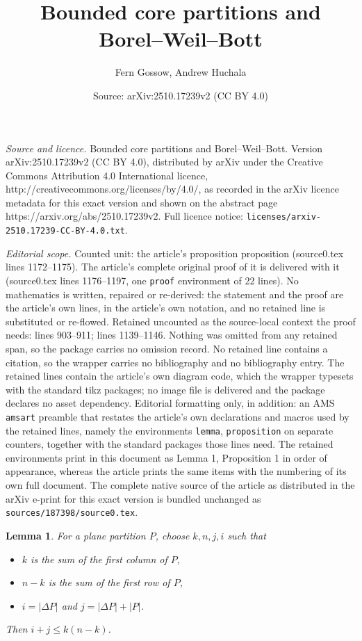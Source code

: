 \documentclass[10pt,a4paper]{amsart}
\title{Bounded core partitions and Borel--Weil--Bott}
\author{Fern Gossow, Andrew Huchala}
\date{Source: arXiv:2510.17239v2 (CC BY 4.0)}
\newtheorem{lemma}{Lemma}
\begin{document}
\maketitle

\noindent\emph{Source and licence.} Bounded core partitions and Borel--Weil--Bott. Version arXiv:2510.17239v2 (CC BY 4.0), distributed by arXiv under the Creative Commons Attribution 4.0 International licence, http://creativecommons.org/licenses/by/4.0/, as recorded in the arXiv licence metadata for this exact version and shown on the abstract page https://arxiv.org/abs/2510.17239v2. Full licence notice: \texttt{licenses/arxiv-2510.17239-CC-BY-4.0.txt}.\par\smallskip

\noindent\textit{Editorial scope.} Counted unit: the article's proposition proposition (source0.tex lines 1172--1175). The article's complete original proof of it is delivered with it (source0.tex lines 1176--1197, one \texttt{proof} environment of 22 lines). No mathematics is written, repaired or re-derived: the statement and the proof are the article's own lines, in the article's own notation, and no retained line is substituted or re-flowed.  Retained uncounted as the source-local context the proof needs: lines 903--911; lines 1139--1146.  Nothing was omitted from any retained span, so the package carries no omission record.  No retained line contains a citation, so the wrapper carries no bibliography and no bibliography entry.  The retained lines contain the article's own diagram code, which the wrapper typesets with the standard tikz packages; no image file is delivered and the package declares no asset dependency.  Editorial formatting only, in addition: an AMS \texttt{amsart} preamble that restates the article's own declarations and macros used by the retained lines, namely the environments \texttt{lemma}, \texttt{proposition} on separate counters, together with the standard packages those lines need.  The retained environments print in this document as Lemma 1, Proposition 1 in order of appearance, whereas the article prints the same items with the numbering of its own full document.  The complete native source of the article as distributed in the arXiv e-print for this exact version is bundled unchanged as \texttt{sources/187398/source0.tex}.
\begin{lemma}\label{lem:nakano}
For a plane partition $P$, choose $k,n,j,i$ such that
\begin{itemize}
\item $k$ is the sum of the first column of $P$,
\item $n-k$ is the sum of the first row of $P$,
\item $i=|\Delta P|$ and $j=|\Delta P|+|P|$.
\end{itemize}
Then $i+j\leq k(n-k)$.
\end{lemma}
\end{document}
